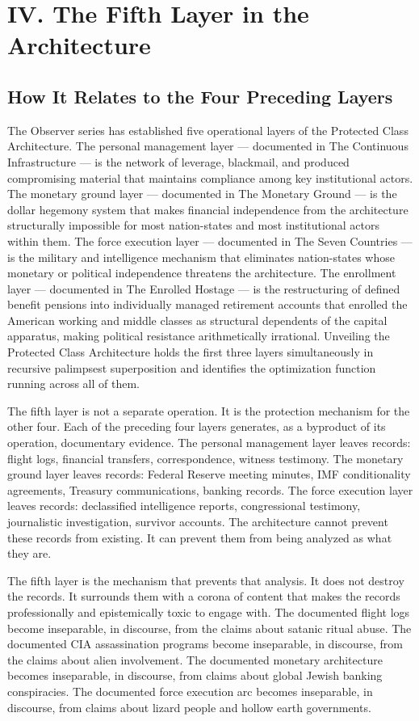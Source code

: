 \documentclass[11pt,a4paper]{article}
\begin{document}
\section{IV. The Fifth Layer in the Architecture}

\subsection{How It Relates to the Four Preceding Layers}

The Observer series has established five operational layers of the Protected Class Architecture. The personal management layer — documented in The Continuous Infrastructure — is the network of leverage, blackmail, and produced compromising material that maintains compliance among key institutional actors. The monetary ground layer — documented in The Monetary Ground — is the dollar hegemony system that makes financial independence from the architecture structurally impossible for most nation-states and most institutional actors within them. The force execution layer — documented in The Seven Countries — is the military and intelligence mechanism that eliminates nation-states whose monetary or political independence threatens the architecture. The enrollment layer — documented in The Enrolled Hostage — is the restructuring of defined benefit pensions into individually managed retirement accounts that enrolled the American working and middle classes as structural dependents of the capital apparatus, making political resistance arithmetically irrational. Unveiling the Protected Class Architecture holds the first three layers simultaneously in recursive palimpsest superposition and identifies the optimization function running across all of them.


The fifth layer is not a separate operation. It is the protection mechanism for the other four. Each of the preceding four layers generates, as a byproduct of its operation, documentary evidence. The personal management layer leaves records: flight logs, financial transfers, correspondence, witness testimony. The monetary ground layer leaves records: Federal Reserve meeting minutes, IMF conditionality agreements, Treasury communications, banking records. The force execution layer leaves records: declassified intelligence reports, congressional testimony, journalistic investigation, survivor accounts. The architecture cannot prevent these records from existing. It can prevent them from being analyzed as what they are.


The fifth layer is the mechanism that prevents that analysis. It does not destroy the records. It surrounds them with a corona of content that makes the records professionally and epistemically toxic to engage with. The documented flight logs become inseparable, in discourse, from the claims about satanic ritual abuse. The documented CIA assassination programs become inseparable, in discourse, from the claims about alien involvement. The documented monetary architecture becomes inseparable, in discourse, from claims about global Jewish banking conspiracies. The documented force execution arc becomes inseparable, in discourse, from claims about lizard people and hollow earth governments.
\end{document}
